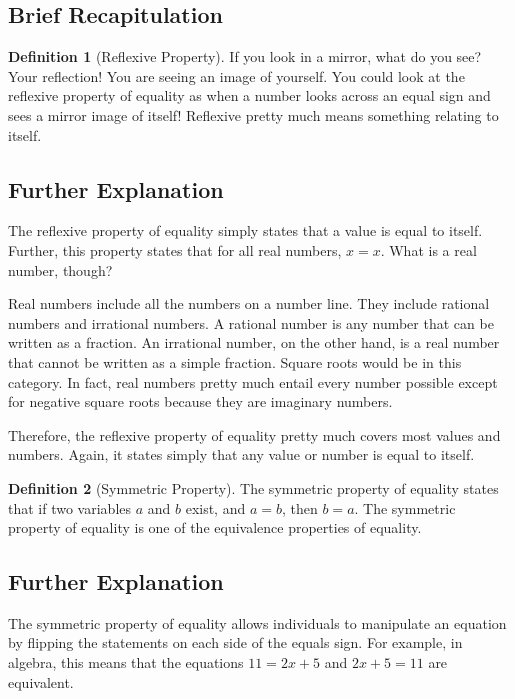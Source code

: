 \documentclass[a4paper,12pt]{article}
\theoremstyle{definition}
\newtheorem{definition}{Definition}
\begin{document}
    \subsection{Brief Recapitulation}

    \begin{definition}[Reflexive Property]
        If you look in a mirror, what do you see? Your reflection! You are seeing an image of yourself.
        You could look at the reflexive property of equality as when a number looks across an equal sign and
        sees a mirror image of itself!
        Reflexive pretty much means something relating to itself.
    \end{definition}

    \subsection*{Further Explanation}

    The reflexive property of equality simply states that a value is equal to itself.
    Further, this property states that for all real numbers, $x = x$.
    What is a real number, though?

    Real numbers include all the numbers on a number line.
    They include rational numbers and irrational numbers.
    A rational number is any number that can be written as a fraction.
    An irrational number, on the other hand, is a real number that cannot be written as a simple fraction.
    Square roots would be in this category. In fact, real numbers pretty much entail every number possible except
    for negative square roots because they are imaginary numbers.

    Therefore, the reflexive property of equality pretty much covers most values and numbers.
    Again, it states simply that any value or number is equal to itself.

    \begin{definition}[Symmetric Property]
        The symmetric property of equality states that if two variables $a$ and $b$ exist, and $a = b$, then $b = a$.
        The symmetric property of equality is one of the equivalence properties of equality.
    \end{definition}

    \subsection*{Further Explanation}

    The symmetric property of equality allows individuals to manipulate an equation by flipping the statements on
    each side of the equals sign.
    For example, in algebra, this means that the equations $11 = 2x + 5$ and $2x + 5 = 11$ are equivalent.
\end{document}
